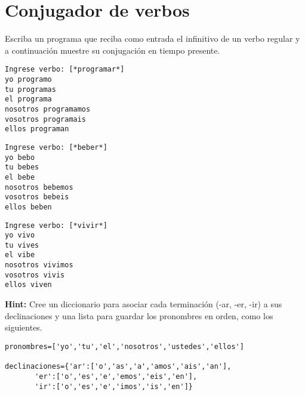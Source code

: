 \section{Conjugador de verbos}
Escriba un programa que reciba como entrada el infinitivo de un verbo regular y a continuación muestre su conjugación en tiempo presente.

\begin{lstlisting}[style=consola]
Ingrese verbo: [*programar*]
yo programo
tu programas
el programa
nosotros programamos
vosotros programais
ellos programan
\end{lstlisting}

\begin{lstlisting}[style=consola]
Ingrese verbo: [*beber*]
yo bebo
tu bebes
el bebe
nosotros bebemos
vosotros bebeis
ellos beben
\end{lstlisting}

\begin{lstlisting}[style=consola]
Ingrese verbo: [*vivir*]
yo vivo
tu vives
el vibe
nosotros vivimos
vosotros vivis
ellos viven
\end{lstlisting}

\textbf{Hint:} Cree un diccionario para asociar cada terminación (-ar, -er, -ir) a sus declinaciones y una lista para guardar los pronombres en orden, como los siguientes.

\begin{lstlisting}[style=consola]
pronombres=['yo','tu','el','nosotros','ustedes','ellos']

declinaciones={'ar':['o','as','a','amos','ais','an'],
       'er':['o','es','e','emos','eis','en'],
       'ir':['o','es','e','imos','is','en']}
\end{lstlisting}

